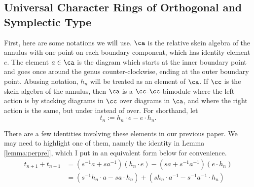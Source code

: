 \subsection{Universal Character Rings of Orthogonal and Symplectic Type}













First, here are some notations we will use. $\ca$ is the relative skein algebra of the annulus with one point on each boundary component, which has identity element $e$. The element $a \in \ca$ is the diagram which starts at the inner boundary point and goes once around the genus counter-clockwise, ending at the outer boundary point. Abusing notation, $h_n$ will be treated as an element of $\ca$. If $\cc$ is the skein algebra of the annulus, then $\ca$ is a $\cc$-$\cc$-bimodule where the left action is by stacking diagrams in $\cc$ over diagrams in $\ca$, and where the right action is the same, but under instead of over. For shorthand, let 
\[t_n := h_n \cdot e - e  \cdot h_n.\]

There are a few identities involving these elements in our previous paper. We may need to highlight one of them, namely the identity in Lemma \ref{lemma:perprel}, which I put in an equivalent form below for convenience.
\begin{equation} \label{eq:skewcommutator}
\begin{split}
t_{n+1} + t_{n-1} &= \left( s^{-1} a + s a^{-1} \right) (h_n \cdot e) - \left( s a + s^{-1} a^{-1} \right) (e \cdot h_n) \\
&= ( s^{-1} h_n \cdot a - s a \cdot h_n ) + (  s h_n \cdot a^{-1} - s^{-1} a^{-1} \cdot h_n ) 
\end{split}
\end{equation}




